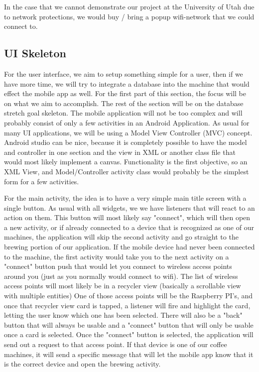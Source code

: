 \documentclass[conference]{IEEEtran}
\begin{document}
In the case that we cannot demonstrate our project at the University of Utah due to network protections,
we would buy / bring a popup wifi-network that we could connect to.

\subsection{UI Skeleton}
For the user interface, we aim to setup something simple for a user, then if we
have more time, we will try to integrate a database into the machine that would
effect the mobile app as well. For the first part of this section, the focus will be
on what we aim to accomplish. The rest of the section will be on the database
stretch goal skeleton. The mobile application will not be too complex and will
probably consist of only a few activities in an Android Application. As usual
for many UI applications, we will be using a Model View Controller (MVC)     
concept.  Android studio can be nice, because it is completely possible to have
the model and controller in one section and the view in XML or another class
file that would most likely implement a canvas. Functionality is the first
objective, so an XML View, and Model/Controller activity class would probably
be the simplest form for a few activities.

For the main activity, the idea is to have a very simple main title screen
with a single button. As usual with all widgets, we we have listeners that will
react to an action on them. This button will most likely say "connect", which
will then open a new activity, or if already connected to a device that is
recognized as one of our machines, the application will skip the second
activity and go straight to the brewing portion of our application. 
If the mobile device had never been connected to the machine, the first
activity would take you to the next activity on a "connect" button push that
would let you connect to wireless access points around you (just as you
normally would connect to wifi). The list of wireless access points will most
likely be in a recycler view (basically a scrollable view with multiple
entities) One of those access points will be the Raspberry PI's, and once that
recycler view card is tapped, a listener will fire and highlight the card,
letting the user know which one has been selected. There will also be a "back"
button that will always be usable and a "connect" button that will only be
usable once a card is selected. Once the "connect" button is selected, the
application will send out a request to that access point. If that device is one
of our coffee machines, it will send a specific message that will let the
mobile app know that it is the correct device and open the brewing activity.
\end{document}
